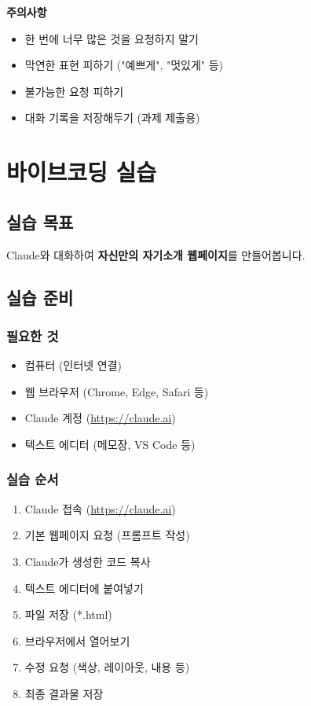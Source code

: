 \documentclass[11pt, a4paper]{article}
\begin{document}
\begin{warning}
\textbf{주의사항}
\begin{itemize}
  \item 한 번에 너무 많은 것을 요청하지 말기
  \item 막연한 표현 피하기 ("예쁘게", "멋있게" 등)
  \item 불가능한 요청 피하기
  \item 대화 기록을 저장해두기 (과제 제출용)
\end{itemize}
\end{warning}

\newpage

\section{바이브코딩 실습}

\subsection{실습 목표}

Claude와 대화하여 \textbf{자신만의 자기소개 웹페이지}를 만들어봅니다.

\subsection{실습 준비}

\subsubsection{필요한 것}
\begin{itemize}
  \item 컴퓨터 (인터넷 연결)
  \item 웹 브라우저 (Chrome, Edge, Safari 등)
  \item Claude 계정 (\url{https://claude.ai})
  \item 텍스트 에디터 (메모장, VS Code 등)
\end{itemize}

\subsubsection{실습 순서}

\begin{enumerate}
  \item Claude 접속 (\url{https://claude.ai})
  \item 기본 웹페이지 요청 (프롬프트 작성)
  \item Claude가 생성한 코드 복사
  \item 텍스트 에디터에 붙여넣기
  \item 파일 저장 (*.html)
  \item 브라우저에서 열어보기
  \item 수정 요청 (색상, 레이아웃, 내용 등)
  \item 최종 결과물 저장
\end{enumerate}
\end{document}
